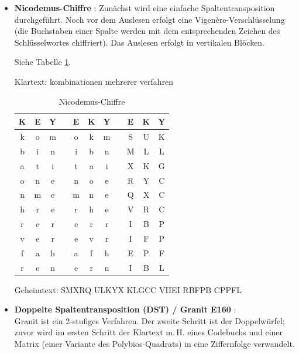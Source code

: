 \begin{refsegment}
\begin{itemize}
\begin{table}[ht]
   \end{table}

\item \textbf{Nicodemus-Chiffre} \cite{ACA2002}:
   Zunächst wird eine einfache Spaltentransposition durchgeführt. Noch vor
   dem Auslesen erfolgt eine Vigen\`ere-Verschlüsselung (die Buchstaben einer
   Spalte werden mit dem entsprechenden Zeichen des Schlüsselwortes
   chiffriert).
   Das Auslesen erfolgt in vertikalen Blöcken.

   Siehe Tabelle \ref{Nicodemus-table-reference}.

   Klartext: kombinationen mehrerer verfahren

   \begin{table}[ht]
   \begin{center}
   \begin{tabular}{|ccccccccccc|}
   \hline
	K & E & Y & & E & K & Y & & E & K & Y\\
   \hline
	k & o & m & & o & k & m & & S & U & K\\
	b & i & n & & i & b & n & & M & L & L\\
	a & t & i & & t & a & i & & X & K & G\\
	o & n & e & & n & o & e & & R & Y & C\\
	n & m & e & & m & n & e & & Q & X & C\\
	h & r & e & & r & h & e & & V & R & C\\
	r & e & r & & e & r & r & & I & B & P\\
	v & e & r & & e & v & r & & I & F & P\\
	f & a & h & & a & f & h & & E & P & F\\
	r & e & n & & e & r & n & & I & B & L\\
   \hline
   \end{tabular}
   \caption{Nicodemus-Chiffre}
   \label{Nicodemus-table-reference}
   \end{center}
   \end{table}

   Geheimtext: SMXRQ ULKYX KLGCC VIIEI RBFPB CPPFL\\



\item \textbf{Doppelte Spaltentransposition (DST) / \glqq Granit E160\grqq}
   \cite{Drobick2015}:\\%
     Granit ist ein 2-stufiges Verfahren. Der zweite Schritt ist der Doppelwürfel;
     zuvor wird im ersten Schritt der Klartext m.\,H. eines Codebuchs und einer
     Matrix (einer Variante des Polybios-Quadrats) in eine Ziffernfolge verwandelt.


\end{itemize}
\end{refsegment}
